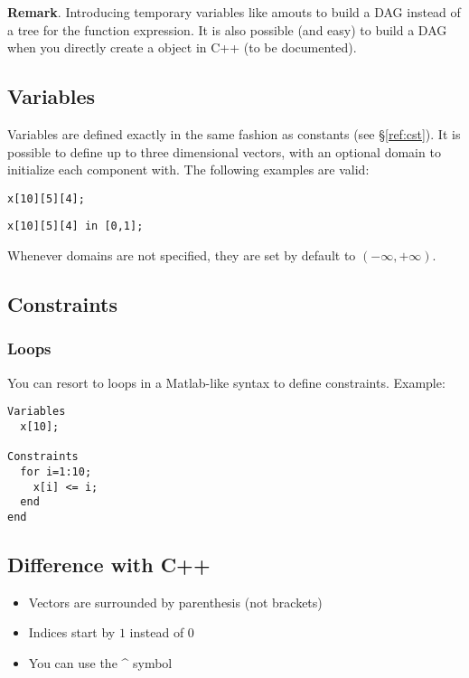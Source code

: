 {\bf Remark}. Introducing temporary variables like  amouts to build a DAG instead of
a tree for the function expression. It is also possible (and easy) to build a DAG when you directly create
a  object in C++ (to be documented).

\subsection{Variables}

Variables are defined exactly in the same fashion as constants (see \S\ref{ref:cst}).
It is possible to define up to three dimensional vectors, with an optional domain to initialize each
component with. The following examples are valid:

{\tt x[10][5][4];}

{\tt x[10][5][4] in [0,1];}

Whenever domains are not specified, they are set by default to $(-\infty,+\infty)$.

\subsection{Constraints}
\subsubsection{Loops}

You can resort to loops in a Matlab-like syntax to define constraints. Example:

\begin{verbatim}
Variables
  x[10];

Constraints
  for i=1:10;
    x[i] <= i;
  end
end
\end{verbatim}

\subsection{Difference with C++}

\begin{itemize}
\item Vectors are surrounded by parenthesis (not brackets)
\item Indices start by $1$ instead of $0$
\item You can use the \^{} symbol
\end{itemize}


